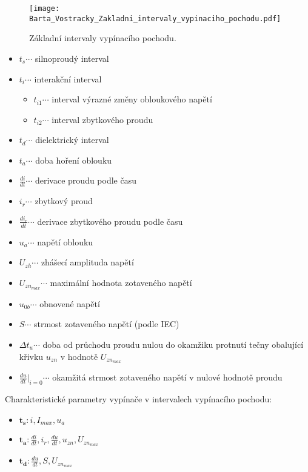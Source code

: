       \begin{figure*}
        \centering
        \texttt{[image: Barta\_Vostracky\_Zakladni\_intervaly\_vypinaciho\_pochodu.pdf]}
        \caption[Základní intervaly vypínacího pochodu.]{Základní intervaly vypínacího pochodu.}
        \label{epr:fig_zakl_int_vyp_pochodu}
      \end{figure*}

      \begin{itemize}\addtolength{\itemsep}{-0.5\baselineskip}
        \item $t_s\cdots$     silnoproudý interval
        \item $t_i\cdots$     interakční interval
          \begin{itemize}
            \item $t_{i1}\cdots$  interval výrazné změny obloukového napětí
            \item $t_{i2}\cdots$  interval zbytkového proudu
          \end{itemize}
        \item $t_d\cdots$    dielektrický interval
        \item $t_a\cdots$    doba hoření oblouku
        \item $\frac{di}{dt}\cdots$ derivace proudu podle času
        \item $i_r\cdots$    zbytkový proud
        \item $\frac{di_r}{dt}\cdots$ derivace zbytkového proudu podle času
        \item $u_a\cdots$    napětí oblouku
        \item $U_{zh}\cdots$ zhášecí amplituda napětí
        \item $U_{zn_{max}}\cdots$ maximální hodnota zotaveného napětí
        \item $u_{0b}\cdots$ obnovené napětí
        \item $S\cdots$      strmost zotaveného napětí (podle IEC)
        \item $\Delta t_u\cdots$ doba od průchodu proudu nulou do okamžiku protnutí tečny obalující
              křivku $u_{zn}$ v hodnotě $U_{zn_{max}}$
        \item $\frac{du}{dt}|_{i=0}\cdots$ okamžitá strmost zotaveného napětí v nulové hodnotě
              proudu
      \end{itemize}
      Charakteristické parametry vypínače v intervalech vypínacího pochodu:
      \begin{itemize}\addtolength{\itemsep}{-0.5\baselineskip}
        \item $\mathbf{t_s}: i, I_{max}, u_a$
        \item $\mathbf{t_a}: \frac{di}{dt},i_r, \frac{du}{dt}, u_{zn}, U_{zn_{max}}$
        \item $\mathbf{t_d}: \frac{du}{dt}, S, U_{zn_{max}}$
      \end{itemize}

